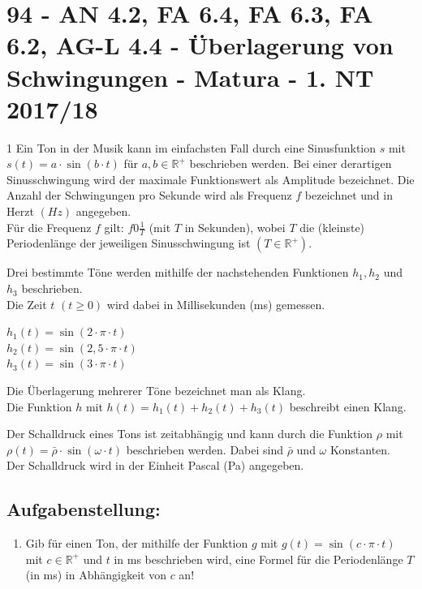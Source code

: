 \section{94 - AN 4.2, FA 6.4, FA 6.3, FA 6.2, AG-L 4.4 - Überlagerung von Schwingungen - Matura - 1. NT 2017/18}

\begin{langesbeispiel} \item[1] %
Ein Ton in der Musik kann im einfachsten Fall durch eine Sinusfunktion $s$ mit $s(t)=a\cdot\sin(b\cdot t)$ für $a,b\in\mathbb{R}^+$ beschrieben werden. Bei einer derartigen Sinusschwingung wird der maximale Funktionswert als Amplitude bezeichnet. Die Anzahl der Schwingungen pro Sekunde wird als Frequenz $f$ bezeichnet und in Herzt $(Hz)$ angegeben.\\
Für die Frequenz $f$ gilt: $f0\frac{1}{T}$ (mit $T$ in Sekunden), wobei $T$ die (kleinste) Periodenlänge der jeweiligen Sinusschwingung ist $(T\in\mathbb{R}^+)$.

Drei bestimmte Töne werden mithilfe der nachstehenden Funktionen $h_1, h_2$ und $h_3$ beschrieben.\\
Die Zeit $t$ $(t\geq 0)$ wird dabei in Millisekunden (ms) gemessen.

$h_1(t)=\sin(2\cdot\pi\cdot t)$\\
$h_2(t)=\sin(2,5\cdot\pi\cdot t)$\\
$h_3(t)=\sin(3\cdot\pi\cdot t)$

Die Überlagerung mehrerer Töne bezeichnet man als Klang.\\
Die Funktion $h$ mit $h(t)=h_1(t)+h_2(t)+h_3(t)$ beschreibt einen Klang.

Der Schalldruck eines Tons ist zeitabhängig und kann durch die Funktion $\rho$ mit $\rho(t)=\bar{\rho}\cdot\sin(\omega\cdot t)$ beschrieben werden. Dabei sind $\bar{\rho}$ und $\omega$ Konstanten.\\
Der Schalldruck wird in der Einheit Pascal (Pa) angegeben.


\subsection{Aufgabenstellung:}
\begin{enumerate}
	\item Gib für einen Ton, der mithilfe der Funktion $g$ mit $g(t)=\sin(c\cdot\pi\cdot t)$ mit $c\in\mathbb{R}^+$ und $t$ in ms beschrieben wird, eine Formel für die Periodenlänge $T$ (in ms) in Abhängigkeit von $c$ an!
		

\end{enumerate}
\end{langesbeispiel}
